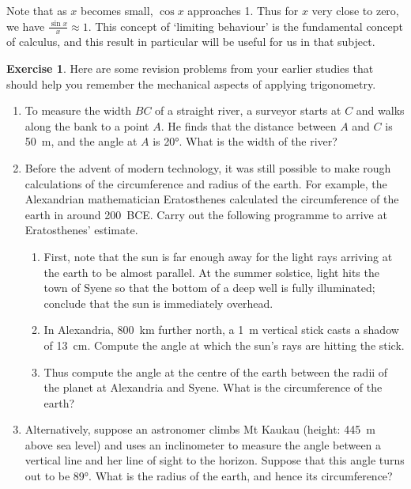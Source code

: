 \documentclass[a4paper,leqno]{article}
\numberwithin{equation}{section}
\theoremstyle{definition}
\newtheorem{exercise}[equation]{Exercise}
\theoremstyle{remark}
\begin{document}
Note that as $ x $ becomes small, $ \cos x $ approaches 1. Thus for $ x $ very close to zero, we have $ \frac{\sin x}{x} \approx 1 $. This
concept of `limiting behaviour' is the fundamental concept of calculus, and this result in particular will be useful for us in that subject.

\begin{exercise}
  Here are some revision problems from your earlier studies that should help you remember
  the mechanical aspects of applying trigonometry.
  \begin{enumerate}
    \item To measure the width $ BC $ of a straight river, a surveyor starts at $ C $ and walks
          along the bank to a point $ A $. He finds that the distance between $ A $ and $ C $
          is \SI{50}{\metre}, and the angle at $ A $ is \ang{20}. What is the width of the river?
    \item Before the advent of modern technology, it was still possible to make rough calculations
          of the circumference and radius of the earth. For example, the Alexandrian mathematician
          Eratosthenes calculated the circumference of the earth in around 200~BCE. Carry out the
          following programme to arrive at Eratosthenes' estimate.
          \begin{enumerate}
            \item First, note that the sun is far enough away for the light rays arriving at the earth to be almost
                  parallel. At the summer solstice, light hits the town of Syene so that the bottom
                  of a deep well is fully illuminated; conclude that the sun is immediately overhead.
            \item In Alexandria, \SI{800}{\kilo\metre} further north, a \SI{1}{\metre} vertical stick casts
                  a shadow of \SI{13}{\centi\metre}. Compute the angle at which the sun's rays are hitting
                  the stick.
            \item Thus compute the angle at the centre of the earth between the radii of the planet at Alexandria
                  and Syene. What is the circumference of the earth?
          \end{enumerate}
    \item Alternatively, suppose an astronomer climbs Mt Kaukau (height: \SI{445}{\metre} above sea level) and uses
          an inclinometer to measure the angle between a vertical line and her line of sight to the horizon. Suppose
          that this angle turns out to be \ang{89}. What is the radius of the earth, and hence its circumference?
  \end{enumerate}
\end{exercise}
\end{document}
